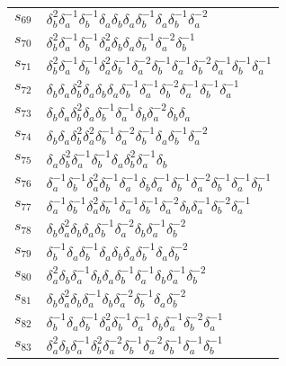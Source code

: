 \documentclass{article}
\begin{document}
\begin{center}
\begin{tabular}{ll}
$s_{69}$ & $\delta_b^{2}\delta_a^{-1}\delta_b^{-1}\delta_a^{}\delta_b^{}\delta_a^{}\delta_b^{-1}\delta_a^{}\delta_b^{-1}\delta_a^{-2}$ \\
$s_{70}$ & $\delta_b^{2}\delta_a^{-1}\delta_b^{-1}\delta_a^{2}\delta_b^{}\delta_a^{}\delta_b^{-1}\delta_a^{-2}\delta_b^{-1}$ \\
$s_{71}$ & $\delta_b^{2}\delta_a^{-1}\delta_b^{-1}\delta_a^{2}\delta_b^{-1}\delta_a^{-2}\delta_b^{-1}\delta_a^{-1}\delta_b^{-2}\delta_a^{-1}\delta_b^{-1}\delta_a^{-1}$ \\
$s_{72}$ & $\delta_b^{}\delta_a^{}\delta_b^{2}\delta_a^{}\delta_b^{}\delta_a^{}\delta_b^{-1}\delta_a^{-1}\delta_b^{-2}\delta_a^{-1}\delta_b^{-1}\delta_a^{-1}$ \\
$s_{73}$ & $\delta_b^{}\delta_a^{}\delta_b^{2}\delta_a^{}\delta_b^{-1}\delta_a^{-1}\delta_b^{}\delta_a^{-2}\delta_b^{}\delta_a^{}$ \\
$s_{74}$ & $\delta_b^{}\delta_a^{}\delta_b^{2}\delta_a^{2}\delta_b^{-1}\delta_a^{-2}\delta_b^{-1}\delta_a^{}\delta_b^{-1}\delta_a^{-2}$ \\
$s_{75}$ & $\delta_a^{}\delta_b^{2}\delta_a^{-1}\delta_b^{-1}\delta_a^{}\delta_b^{2}\delta_a^{-1}\delta_b^{}$ \\
$s_{76}$ & $\delta_a^{-1}\delta_b^{-1}\delta_a^{2}\delta_b^{-1}\delta_a^{-1}\delta_b^{}\delta_a^{-1}\delta_b^{-1}\delta_a^{-2}\delta_b^{-1}\delta_a^{-1}\delta_b^{-1}$ \\
$s_{77}$ & $\delta_a^{-1}\delta_b^{-1}\delta_a^{2}\delta_b^{-1}\delta_a^{-1}\delta_b^{-1}\delta_a^{-2}\delta_b^{}\delta_a^{-1}\delta_b^{-2}\delta_a^{-1}$ \\
$s_{78}$ & $\delta_b^{}\delta_a^{2}\delta_b^{}\delta_a^{}\delta_b^{-1}\delta_a^{-2}\delta_b^{}\delta_a^{-1}\delta_b^{-2}$ \\
$s_{79}$ & $\delta_b^{-1}\delta_a^{}\delta_b^{-1}\delta_a^{}\delta_b^{}\delta_a^{}\delta_b^{-1}\delta_a^{}\delta_b^{-2}$ \\
$s_{80}$ & $\delta_a^{2}\delta_b^{}\delta_a^{-1}\delta_b^{}\delta_a^{}\delta_b^{-1}\delta_a^{-1}\delta_b^{}\delta_a^{-1}\delta_b^{-2}$ \\
$s_{81}$ & $\delta_b^{}\delta_a^{2}\delta_b^{}\delta_a^{-1}\delta_b^{}\delta_a^{-2}\delta_b^{-1}\delta_a^{}\delta_b^{-2}$ \\
$s_{82}$ & $\delta_b^{-1}\delta_a^{}\delta_b^{-1}\delta_a^{2}\delta_b^{-1}\delta_a^{-1}\delta_b^{}\delta_a^{-1}\delta_b^{-2}\delta_a^{-1}$ \\
$s_{83}$ & $\delta_a^{2}\delta_b^{}\delta_a^{-1}\delta_b^{2}\delta_a^{-2}\delta_b^{-1}\delta_a^{-2}\delta_b^{-1}\delta_a^{-1}\delta_b^{-1}$ \\

\end{tabular}
\end{center}
\end{document}
